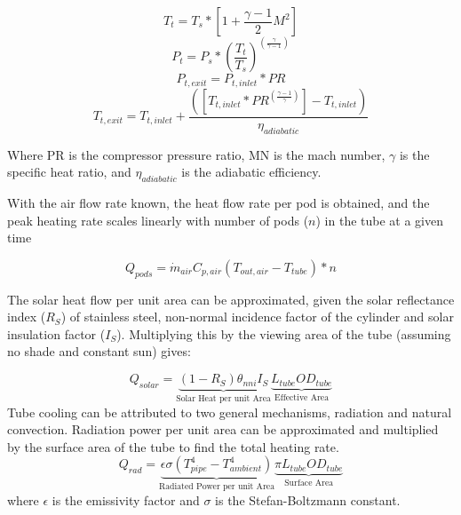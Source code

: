 \documentclass[heading.tex]{subfiles}
\begin{document}
\begin{equation}
T_{t} = T_{s} * [1 + \frac{\gamma -1}{2} M^2]
\end{equation}
\begin{equation}
P_{t} = P_{s} * (\frac{ T_{t}}{T_{s}})^(\frac{\gamma}{\gamma -1})
\end{equation}
\begin{equation}
P_{t,exit} = P_{t,inlet} * PR
\end{equation}
\begin{equation}
T_{t,exit} = T_{t,inlet} + \frac{([T_{t,inlet}*PR^{(\frac{\gamma-1}{\gamma})}] - T_{t,inlet})}  {{\eta}_{adiabatic}}
\end{equation}

Where PR is the compressor pressure ratio, MN is the mach number,  $\gamma$ is the specific heat ratio, and  ${\eta}_{adiabatic}$ is the
adiabatic efficiency.

With the air flow rate known, the heat flow rate per pod is obtained, 
and the peak heating rate scales linearly with number of pods ($n$) in the tube at a given time

\begin{equation}
{Q}_{pods}= \dot{m}_{air} C_{p,air} (T_{out, air} - T_{tube}) * n
\end{equation}

The solar heat flow per unit area can be approximated, given the solar reflectance index ($R_{S}$) of stainless steel, non-normal incidence factor
of the cylinder and solar insulation factor ($I_{S}$).
Multiplying this by the viewing area of the tube (assuming no shade and constant sun) gives:


\begin{equation}
Q_{solar} = \underbrace{ (1-R_{S})  {\theta}_{nni}  I_{S}}_\text{Solar Heat per unit Area} \underbrace{L_{tube}  OD_{tube}}_\text{Effective Area}
\end{equation}
Tube cooling can be attributed to two general mechanisms, radiation and natural convection. Radiation power per unit area can be
approximated and multiplied by the surface area of the tube to find the total heating rate.
\begin{equation}
Q_{rad} = \underbrace{\epsilon \sigma (T_{pipe}^4 - T_{ambient}^4)}_\text{Radiated Power per unit Area}\underbrace{\pi L_{tube} OD_{tube}}_\text{Surface Area}
\end{equation}
where  $\epsilon$ is the emissivity factor and  $\sigma$ is the Stefan-Boltzmann constant.
\end{document}
